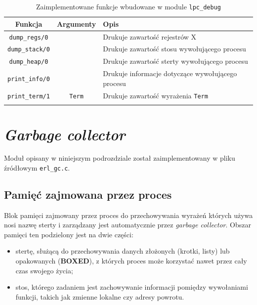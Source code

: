 \begin{longtable}{|c|c|p{10cm}|}
\hline

Funkcja & Argumenty & Opis \\
\endfirsthead
\hline
\texttt{dump\_regs/0} &  & Drukuje zawartość rejestrów X\\
\hline
\texttt{dump\_stack/0} &  & Drukuje zawartość stosu wywołującego procesu\\
\hline
\texttt{dump\_heap/0} &  & Drukuje zawartość sterty wywołującego procesu\\
\hline
\texttt{print\_info/0} &  & Drukuje informacje dotyczące wywołującego procesu\\
\hline
\texttt{print\_term/1} & \texttt{Term}  & Drukuje zawartość wyrażenia \texttt{Term} \\
\hline
\caption{Zaimplementowane funkcje wbudowane w module \texttt{lpc\_debug}} 
\label{table:bifDebug} \\
\end{longtable}

\section{\emph{Garbage collector}}
\label{sec:maszynaGC}

Moduł opisany w niniejszym podrozdziale został zaimplementowany w pliku źródłowym \texttt{erl\_gc.c}.

\subsection{Pamięć zajmowana przez proces}
\label{sub:gcHeap}

Blok pamięci zajmowany przez proces do przechowywania wyrażeń których używa nosi nazwę sterty i zarządzany jest automatycznie przez \emph{garbage collector}.
Obszar pamięci ten podzielony jest na dwie części:
\begin{itemize}
\item stertę, służącą do przechowywania danych złożonych (krotki, listy) lub opakowanych (\textbf{BOXED}), z których proces może korzystać nawet przez cały czas swojego życia;
\item stos, którego zadaniem jest zachowywanie informacji pomiędzy wywołaniami funkcji, takich jak zmienne lokalne czy adresy powrotu.
\end{itemize}

